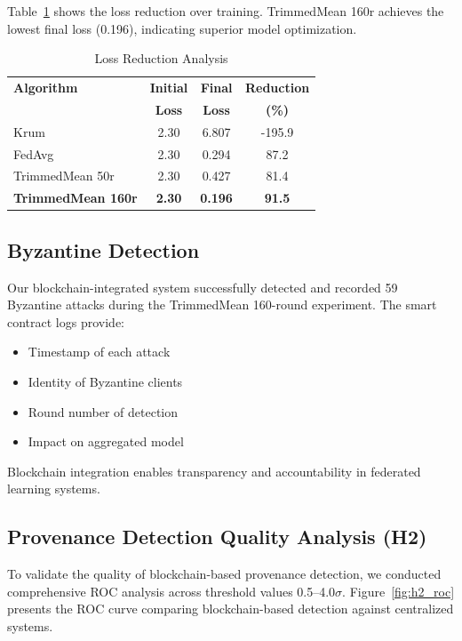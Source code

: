 \documentclass[12pt,a4paper,onecolumn]{article}
\begin{document}
Table~\ref{tab:loss_analysis} shows the loss reduction over training. TrimmedMean 160r achieves the lowest final loss (0.196), indicating superior model optimization.

\begin{table}[t]
\caption{Loss Reduction Analysis}
\label{tab:loss_analysis}
\centering
\begin{tabular}{lccc}
\toprule
\textbf{Algorithm} & \textbf{Initial} & \textbf{Final} & \textbf{Reduction} \\
& \textbf{Loss} & \textbf{Loss} & \textbf{(\%)} \\
\midrule
Krum & 2.30 & 6.807 & -195.9 \\
FedAvg & 2.30 & 0.294 & 87.2 \\
TrimmedMean 50r & 2.30 & 0.427 & 81.4 \\
\textbf{TrimmedMean 160r} & \textbf{2.30} & \textbf{0.196} & \textbf{91.5} \\
\bottomrule
\end{tabular}
\end{table}

\subsection{Byzantine Detection}

Our blockchain-integrated system successfully detected and recorded 59 Byzantine attacks during the TrimmedMean 160-round experiment. The smart contract logs provide:

\begin{itemize}
    \item Timestamp of each attack
    \item Identity of Byzantine clients
    \item Round number of detection
    \item Impact on aggregated model
\end{itemize}

Blockchain integration enables transparency and accountability in federated learning systems.

\subsection{Provenance Detection Quality Analysis (H2)}

To validate the quality of blockchain-based provenance detection, we conducted comprehensive ROC analysis across threshold values 0.5--4.0$\sigma$. Figure~\ref{fig:h2_roc} presents the ROC curve comparing blockchain-based detection against centralized systems.
\end{document}
